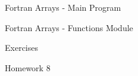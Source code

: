 \documentclass[aspectratio=1610]{beamer}
\begin{document}
\begin{frame}[allowframebreaks]{Fortran Arrays - Main Program}
 
\end{frame}

\begin{frame}[allowframebreaks]{Fortran Arrays - Functions Module}
 
\end{frame}

\begin{frame}{Exercises}

Homework 8


\end{frame}
\end{document}
